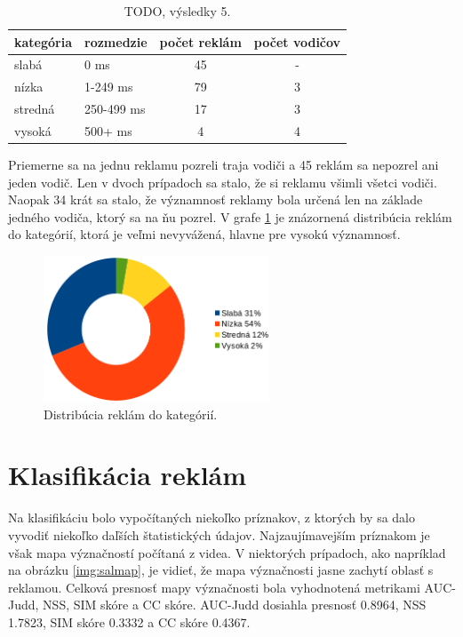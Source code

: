 \begin{table}[ht]
\centering
\begin{tabular}{|l l c c|}
 \hline
 kategória &	rozmedzie &	počet reklám &	počet vodičov \\ [0.5ex]
 \hline
slabá &	0 ms &	45 &	- \\ [0.1ex]
nízka &	1-249 ms &	79 &	3 \\ [0.1ex]
stredná &	250-499 ms &	17 &	3 \\ [0.1ex]
vysoká &	500+ ms &	4 &	4 \\ [0.1ex]
 \hline
\end{tabular}
\caption{TODO, výsledky 5.}
\label{table:cat}
\end{table}

Priemerne sa na jednu reklamu pozreli traja vodiči a 45 reklám sa nepozrel ani jeden vodič. Len v dvoch prípadoch sa stalo, že si reklamu všimli všetci vodiči. Naopak 34 krát sa stalo, že významnosť reklamy bola určená len na základe jedného vodiča, ktorý sa na ňu pozrel. V grafe \ref{img:chart} je znázornená distribúcia reklám do kategórií, ktorá je veľmi nevyvážená, hlavne pre vysokú významnosť.

\begin{figure}[ht]
    \centering
    \includegraphics[width=0.6\textwidth]{images/05/chart.png}
    \caption{Distribúcia reklám do kategórií.}
    \label{img:chart}
\end{figure}

\section{Klasifikácia reklám}

Na klasifikáciu bolo vypočítaných niekoľko príznakov, z ktorých by sa dalo vyvodiť niekoľko daľších štatistických údajov. Najzaujímavejším príznakom je však mapa význačností počítaná z videa. V niektorých prípadoch, ako napríklad na obrázku \ref{img:salmap}, je vidieť, že mapa význačnosti jasne zachytí oblasť s reklamou. Celková presnosť mapy význačnosti bola vyhodnotená metrikami AUC-Judd, NSS, SIM skóre a CC skóre. AUC-Judd dosiahla presnosť 0.8964, NSS 1.7823, SIM skóre 0.3332 a CC skóre 0.4367.

